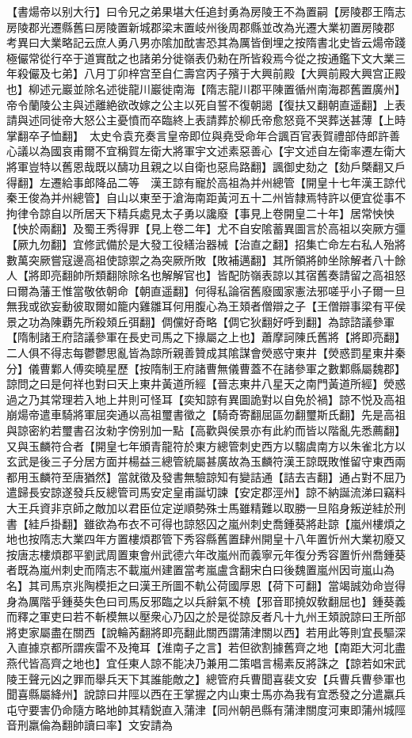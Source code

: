 【書煬帝以别大行】曰令兄之弟果堪大任追封勇為房陵王不為置嗣【房陵郡王隋志房陵郡光遷縣舊曰房陵置新城郡梁末置岐州後周郡縣並改為光遷大業初置房陵郡　考異曰大業略記云庶人勇八男亦隂加酖害恐其為厲皆倒埋之按隋書北史皆云煬帝踐極儼常從行卒于道實酖之也諸弟分徙嶺表仍勑在所皆殺焉今從之按通鑑下文大業三年殺儼及七弟】八月丁卯梓宫至自仁壽宫丙子殯于大興前殿【大興前殿大興宫正殿也】柳述元巖並除名述徙龍川巖徙南海【隋志龍川郡平陳置循州南海郡舊置廣州】帝令蘭陵公主與述離絶欲改嫁之公主以死自誓不復朝謁【復扶又翻朝直遥翻】上表請與述同徙帝大怒公主憂憤而卒臨終上表請葬於柳氏帝愈怒竟不哭葬送甚薄【上時掌翻卒子恤翻】　太史令袁充奏言皇帝即位與堯受命年合諷百官表賀禮部侍郎許善心議以為國哀甫爾不宜稱賀左衛大將軍宇文述素惡善心【宇文述自左衛率遷左衛大將軍豈特以舊恩哉既以醻功且親之以自衛也惡烏路翻】諷御史劾之【劾戶槩翻又戶得翻】左遷給事郎降品二等　漢王諒有寵於高祖為并州總管【開皇十七年漢王諒代秦王俊為并州總管】自山以東至于滄海南距黃河五十二州皆隸焉特許以便宜從事不拘律令諒自以所居天下精兵處見太子勇以讒廢【事見上卷開皇二十年】居常怏怏【怏於兩翻】及蜀王秀得罪【見上卷二年】尤不自安隂蓄異圖言於高祖以突厥方彊【厥九勿翻】宜修武備於是大發工役繕治器械【治直之翻】招集亡命左右私人殆將數萬突厥嘗寇邊高祖使諒禦之為突厥所敗【敗補邁翻】其所領將帥坐除解者八十餘人【將即亮翻帥所類翻除除名也解解官也】皆配防嶺表諒以其宿舊奏請留之高祖怒曰爾為藩王惟當敬依朝命【朝直遥翻】何得私論宿舊廢國家憲法邪嗟乎小子爾一旦無我或欲妄動彼取爾如籠内雞雛耳何用腹心為王頍者僧辯之子【王僧辯事梁有平侯景之功為陳覇先所殺頍丘弭翻】倜儻好奇略【倜它狄翻好呼到翻】為諒諮議參軍【隋制諸王府諮議參軍在長史司馬之下掾屬之上也】蕭摩訶陳氏舊將【將即亮翻】二人俱不得志每鬱鬱思亂皆為諒所親善贊成其隂謀會熒惑守東井【熒惑罰星東井秦分】儀曹鄴人傅奕曉星歷【按隋制王府諸曹無儀曹蓋不在諸參軍之數鄴縣屬魏郡】諒問之曰是何祥也對曰天上東井黃道所經【晉志東井八星天之南門黃道所經】熒惑過之乃其常理若入地上井則可怪耳【奕知諒有異圖詭對以自免於禍】諒不悦及高祖崩煬帝遣車騎將軍屈突通以高祖璽書徵之【騎奇寄翻屈區勿翻璽斯氏翻】先是高祖與諒密約若璽書召汝勑字傍别加一點【高歡與侯景亦有此約而皆以階亂先悉薦翻】又與玉麟符合者【開皇七年頒青龍符於東方總管刺史西方以騶虞南方以朱雀北方以玄武是後三子分居方面并楊益三總管統屬甚廣故為玉麟符漢王諒既敗惟留守東西兩都用玉麟符至唐猶然】當就徵及發書無驗諒知有變詰通【詰去吉翻】通占對不屈乃遣歸長安諒遂發兵反總管司馬安定皇甫誕切諫【安定郡涇州】諒不納誕流涕曰竊料大王兵資非京師之敵加以君臣位定逆順勢殊士馬雖精難以取勝一旦陷身叛逆絓於刑書【絓戶掛翻】雖欲為布衣不可得也諒怒囚之嵐州刺史喬鍾葵將赴諒【嵐州樓煩之地也按隋志大業四年方置樓煩郡管下秀容縣舊置肆州開皇十八年置忻州大業初廢又按唐志樓煩郡平劉武周置東會州武德六年改嵐州而義寧元年復分秀容置忻州喬鍾葵者既為嵐州刺史而隋志不載嵐州建置當考嵐盧含翻宋白曰後魏置嵐州因岢嵐山為名】其司馬京兆陶模拒之曰漢王所圖不軌公荷國厚恩【荷下可翻】當竭誠効命豈得身為厲階乎鍾葵失色曰司馬反邪臨之以兵辭氣不橈【邪音耶撓奴敎翻屈也】鍾葵義而釋之軍吏曰若不斬模無以壓衆心乃囚之於是從諒反者凡十九州王頍說諒曰王所部將吏家屬盡在關西【說輪芮翻將即亮翻此關西謂蒲津關以西】若用此等則宜長驅深入直據京都所謂疾雷不及掩耳【淮南子之言】若但欲割據舊齊之地【南距大河北盡燕代皆高齊之地也】宜任東人諒不能决乃兼用二策唱言楊素反將誅之【諒若如宋武陵王聲元凶之罪而舉兵天下其誰能敵之】總管府兵曹聞喜裴文安【兵曹兵曹參軍也聞喜縣屬絳州】說諒曰井陘以西在王掌握之内山東士馬亦為我有宜悉發之分遣羸兵屯守要害仍命隨方略地帥其精鋭直入蒲津【同州朝邑縣有蒲津關度河東即蒲州城陘音刑羸倫為翻帥讀曰率】文安請為